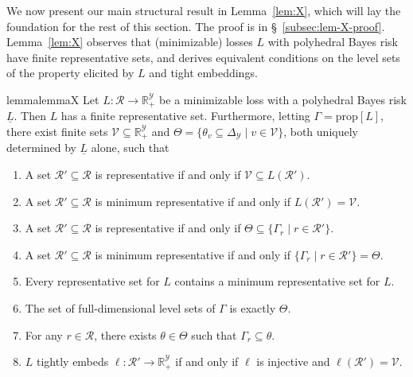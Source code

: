 \documentclass[11pt]{article}
\newcommand{\Comments}{1}
\newcommand{\mynote}[2]{\ifnum\Comments=1\textcolor{#1}{#2}\fi}
\newcommand{\raf}[1]{\mynote{darkgreen}{[RF: #1]}}
\newcommand{\jessie}[1]{\mynote{teal}{[JF: #1]}}
\newcommand{\reals}{\mathbb{R}}
\newcommand{\prop}[1]{\mathrm{prop}[#1]}
\newcommand{\simplex}{\Delta_\Y}
\newcommand{\R}{\mathcal{R}}
\newcommand{\V}{\mathcal{V}}
\newcommand{\Y}{\mathcal{Y}}
\newcommand{\risk}[1]{\underline{#1}}
\begin{document}
We now present our main structural result in Lemma~\ref{lem:X}, which will lay the foundation for the rest of this section.
The proof is in \S~\ref{subsec:lem-X-proof}.
Lemma~\ref{lem:X} observes that (minimizable) losses $L$ with polyhedral Bayes risk have finite representative sets, and derives equivalent conditions on the level sets of the property elicited by $L$ and tight embeddings.

\begin{restatable}{lemma}{lemmaX}\label{lem:X}
  Let $L: \R \to \reals^\Y_+$ be a minimizable loss with a polyhedral Bayes risk $\risk L$.
  Then $L$ has a finite representative set.
  Furthermore, letting $\Gamma = \prop{L}$, there exist finite sets
  $\V \subseteq \reals^\Y_+$ and
  $\Theta = \{\theta_v \subseteq \simplex \mid v\in\V\}$,
  both uniquely determined by $\risk{L}$ alone,
  such that
  \begin{enumerate}
  \item A set $\R'\subseteq\R$ is representative if and only if $\V \subseteq L(\R')$.\label{item:X-rep-V}
  \item A set $\R'\subseteq\R$ is minimum representative if and only if $L(\R') = \V$.\label{item:X-min-V}
  \item A set $\R'\subseteq\R$ is representative if and only if $\Theta \subseteq \{\Gamma_r \mid r \in \R'\}$.\label{item:X-rep-Theta}
  \item A set $\R'\subseteq\R$ is minimum representative if and only if $\{\Gamma_r \mid r \in \R'\} = \Theta$.\label{item:X-min-Theta}
  \item Every representative set for $L$ contains a minimum representative set for $L$.\label{item:X-rep-contain-min}
  \item The set of full-dimensional level sets of $\Gamma$ is exactly $\Theta$.\label{item:X-full-dim}
  \item For any $r \in \R$, there exists $\theta \in \Theta$ such that $\Gamma_r \subseteq \theta$.\label{item:X-redundant}
  \item $L$ tightly embeds $\ell:\R'\to\reals^\Y_+$ if and only if $\ell$ is injective and $\ell(\R') = \V$.\label{item:X-tight-embed}
  \end{enumerate}
\end{restatable}
\end{document}
